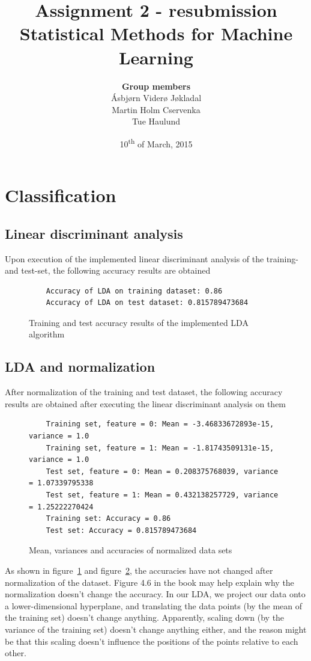 \documentclass[a4paper]{article}
\title{\textbf{Assignment 2 - resubmission} \\ \small Statistical Methods for Machine Learning }
\author{\textbf{Group members}\\
        Ásbjørn Viderø Jøkladal\\
        Martin Holm Cservenka\\
        Tue Haulund}
\date{10\textsuperscript{th} of March, 2015}
\begin{document}
\maketitle
\tableofcontents
\newpage

\section{Classification}

\subsection{Linear discriminant analysis}
Upon execution of the implemented linear discriminant analysis of the training- and test-set, the following accuracy results are obtained
\begin{figure}[H]
	\begin{lstlisting}
	Accuracy of LDA on training dataset: 0.86
	Accuracy of LDA on test dataset: 0.815789473684
	\end{lstlisting}
	\caption{Training and test accuracy results of the implemented LDA algorithm}
	\label{fig:lda_results}
\end{figure}

\subsection{LDA and normalization}
After normalization of the training and test dataset, the following accuracy results are obtained after executing the linear discriminant analysis on them
\begin{figure}[H]
	\begin{lstlisting}
	Training set, feature = 0: Mean = -3.46833672893e-15, variance = 1.0
	Training set, feature = 1: Mean = -1.81743509131e-15, variance = 1.0
	Test set, feature = 0: Mean = 0.208375768039, variance = 1.07339795338
	Test set, feature = 1: Mean = 0.432138257729, variance = 1.25222270424
	Training set: Accuracy = 0.86
	Test set: Accuracy = 0.815789473684
	\end{lstlisting}
	\caption{Mean, variances and accuracies of normalized data sets}
	\label{fig:lda_norm_results}
\end{figure}

As shown in figure~\ref{fig:lda_results} and figure~\ref{fig:lda_norm_results}, the accuracies have not changed after normalization of the dataset. Figure 4.6 in the book may help explain why the normalization doesn't change the accuracy. In our LDA, we project our data onto a lower-dimensional hyperplane, and translating the data points (by the mean of the training set) doesn't change anything. Apparently, scaling down (by the variance of the training set) doesn't change anything either, and the reason might be that this scaling doesn't influence the positions of the points relative to each other.
\end{document}
